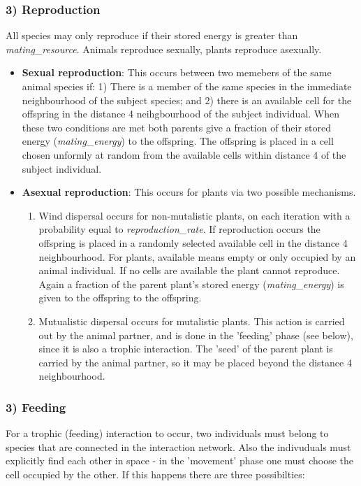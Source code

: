 \subsubsection*{3) Reproduction}
All species may only reproduce if their stored energy is greater than \emph{mating\_resource}. Animals reproduce sexually, plants reproduce asexually.
\begin{itemize}
	\item \textbf{Sexual reproduction}: This occurs between two memebers of the same animal species if: 1) There is a member of the same species in the immediate neighbourhood of the subject species; and 2) there is an available cell for the offspring in the distance 4 neihgbourhood of the subject individual. When these two conditions are met both parents give a fraction of their stored energy (\emph{mating\_energy}) to the offspring. The offspring is placed in a cell chosen unformly at random from the available cells within distance 4 of the subject individual.
	\item \textbf{Asexual reproduction}: This occurs for plants via two possible mechanisms. 
	\begin{enumerate}
	\item Wind dispersal occurs for non-mutalistic plants, on each iteration with a probability equal to \emph{reproduction\_rate}. If reproduction occurs the offspring is placed in a randomly selected available cell in the distance 4 neighbourhood. For plants, available means empty or only occupied by an animal individual. If no cells are available the plant cannot reproduce. Again a fraction of the parent plant's stored energy (\emph{mating\_energy}) is given to the offspring to the offspring.
	\item Mutualistic dispersal occurs for mutalistic plants. This action is carried out by the animal partner, and is done in the 'feeding' phase (see below), since it is also a trophic interaction. The 'seed' of the parent plant is carried by the animal partner, so it may be placed beyond the distance 4 neighbourhood. 
    \end{enumerate}	 
\end{itemize}
\subsubsection*{3) Feeding}
For a trophic (feeding) interaction to occur, two individuals must belong to species that are connected in the interaction network. Also the indivuduals must explicitly find each other in space - in the 'movement' phase one must choose the cell occupied by the other. If this happens there are three possibilties:

